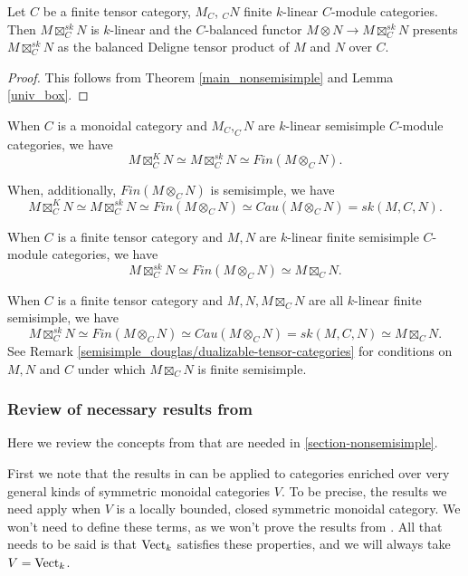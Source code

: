 \begin{corollary}

Let $C$ be a finite tensor category, $M_C$, $_{C}N$ finite $k$-linear $C$-module categories. Then $M\boxtimes_C^{sk}N$ is $k$-linear and the $C$-balanced functor $M\otimes N\to M\boxtimes_C^{sk}N$ presents $M\boxtimes_C^{sk}N$ as the balanced Deligne tensor product of $M$ and $N$ over $C$.\end{corollary}
\begin{proof}

This follows from Theorem \ref{main_nonsemisimple} and Lemma \ref{univ_box}.\end{proof}

\begin{remark}
When $C$ is a monoidal category and $M_C,_{C}N$ are $k$-linear semisimple $C$-module categories, we have $$M\boxtimes^K_{C}N\simeq M\boxtimes_C^{sk}N\simeq Fin(M\otimes_C N).$$

\noindent When, additionally, $Fin(M\otimes_C N)$ is semisimple, we have $$M\boxtimes^K_{C}N\simeq M\boxtimes_C^{sk}N\simeq Fin(M\otimes_C N)\simeq Cau(M\otimes_C N)=sk(M,C,N).$$

\noindent When $C$ is a finite tensor category and $M,N$ are $k$-linear finite semisimple $C$-module categories, we have $$M\boxtimes^{sk}_C N\simeq Fin(M\otimes_C N)\simeq M\boxtimes_C N.$$

\noindent When $C$ is a finite tensor category and $M,N, M\boxtimes_C N$ are all $k$-linear finite semisimple, we have $$M\boxtimes_C^{sk}N\simeq Fin(M\otimes_C N)\simeq Cau(M\otimes_C N)=sk(M,C,N)\simeq M\boxtimes_C N.$$ See Remark \ref{semisimple_douglas/dualizable-tensor-categories} for conditions on $M,N$ and $C$ under which $M\boxtimes_C N$ is finite semisimple.
\end{remark}


\subsubsection{Review of necessary results from \cite{kelly/basic-concepts-enriched}}\label{review_kelly}

Here we review the concepts from \cite{kelly/basic-concepts-enriched} that are needed in \ref{section-nonsemisimple}.

First we note that the results in \cite{kelly/basic-concepts-enriched} can be applied to categories enriched over very general kinds of symmetric monoidal categories $V$. To be precise, the results we need apply when $V$ is a locally bounded, closed symmetric monoidal category. We won't need to define these terms, as we won't prove the results from \cite{kelly/basic-concepts-enriched}. All that needs to be said is that $\operatorname{Vect}_k$ satisfies these properties, and we will always take $V=\operatorname{Vect}_k$.

